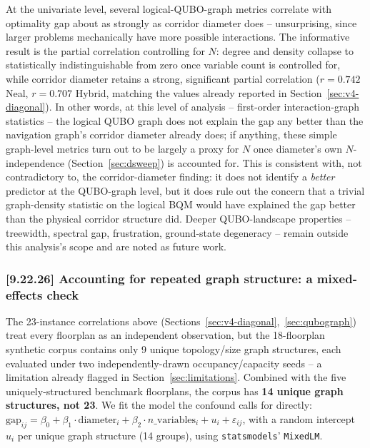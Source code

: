 \documentclass[11pt]{article}
\begin{document}
At the univariate level, several logical-QUBO-graph metrics correlate with optimality gap about as strongly as corridor diameter does -- unsurprising, since larger problems mechanically have more possible interactions. The informative result is the partial correlation controlling for $N$: degree and density collapse to statistically indistinguishable from zero once variable count is controlled for, while corridor diameter retains a strong, significant partial correlation ($r=0.742$ Neal, $r=0.707$ Hybrid, matching the values already reported in Section~\ref{sec:v4-diagonal}). In other words, at this level of analysis -- first-order interaction-graph statistics -- the logical QUBO graph does not explain the gap any better than the navigation graph's corridor diameter already does; if anything, these simple graph-level metrics turn out to be largely a proxy for $N$ once diameter's own $N$-independence (Section~\ref{sec:dsweep}) is accounted for. This is consistent with, not contradictory to, the corridor-diameter finding: it does not identify a \emph{better} predictor at the QUBO-graph level, but it does rule out the concern that a trivial graph-density statistic on the logical BQM would have explained the gap better than the physical corridor structure did. Deeper QUBO-landscape properties -- treewidth, spectral gap, frustration, ground-state degeneracy -- remain outside this analysis's scope and are noted as future work.

\subsubsection{[9.22.26] Accounting for repeated graph structure: a mixed-effects check}
\label{sec:mixedeffects}

The 23-instance correlations above (Sections~\ref{sec:v4-diagonal},~\ref{sec:qubograph}) treat every floorplan as an independent observation, but the 18-floorplan synthetic corpus contains only 9 unique topology/size graph structures, each evaluated under two independently-drawn occupancy/capacity seeds -- a limitation already flagged in Section~\ref{sec:limitations}. Combined with the five uniquely-structured benchmark floorplans, the corpus has \textbf{14 unique graph structures, not 23}. We fit the model the confound calls for directly: $\text{gap}_{ij} = \beta_0 + \beta_1 \cdot \text{diameter}_i + \beta_2 \cdot n\_\text{variables}_i + u_i + \varepsilon_{ij}$, with a random intercept $u_i$ per unique graph structure (14 groups), using \texttt{statsmodels}' \texttt{MixedLM}.
\end{document}
